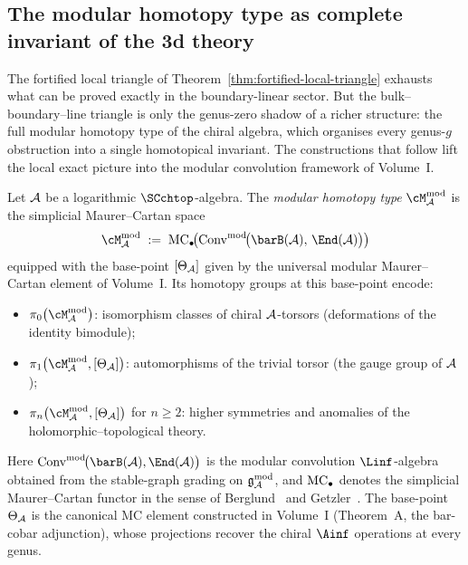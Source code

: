 \subsection{The modular homotopy type as complete invariant of the 3d theory}
\label{subsec:modular-homotopy-type}

The fortified local triangle of
Theorem~\ref{thm:fortified-local-triangle} exhausts what can be
proved exactly in the boundary-linear sector. But the bulk--boundary--line
triangle is only the genus-zero shadow of a richer structure: the
full modular homotopy type of the chiral algebra, which organises
every genus-$g$ obstruction into a single homotopical invariant.
The constructions that follow lift the local exact picture into
the modular convolution framework of Volume~I.

\begin{definition}
\label{def:modular-homotopy-type}
Let $\mathcal{A}$ be a logarithmic $\SCchtop$-algebra.
The \emph{modular homotopy type} $\cM^{\mathrm{mod}}_\cA$ is the
simplicial Maurer--Cartan space
\begin{equation}\label{eq:modular-homotopy-type}
\cM^{\mathrm{mod}}_\cA
\;:=\;
\MC_\bullet\!\bigl(
 \Conv^{\mathrm{mod}}\!\bigl(\barB(\cA),\, \End(\cA)\bigr)
\bigr)
\end{equation}
equipped with the base-point $[\Theta_{\mathcal{A}}]$ given by the
universal modular Maurer--Cartan element of Volume~I. Its
homotopy groups at this base-point encode:
\begin{itemize}[leftmargin=1.8em]
\item $\pi_0\bigl(\cM^{\mathrm{mod}}_\cA\bigr)$: isomorphism
 classes of chiral $\mathcal{A}$-torsors (deformations of the identity
 bimodule);
\item $\pi_1\bigl(\cM^{\mathrm{mod}}_\cA, [\Theta_\cA]\bigr)$:
 automorphisms of the trivial torsor (the gauge group of $\mathcal{A}$);
\item $\pi_n\bigl(\cM^{\mathrm{mod}}_\cA, [\Theta_\cA]\bigr)$
 for $n\ge 2$: higher symmetries and anomalies of the
 holomorphic--topological theory.
\end{itemize}
\end{definition}

\noindent
Here $\Conv^{\mathrm{mod}}\!\bigl(\barB(\cA),\End(\cA)\bigr)$
is the modular convolution $\Linf$-algebra obtained from the
stable-graph grading on $\mathfrak{g}^{\mathrm{mod}}_{\mathcal{A}}$, and $\operatorname{MC}_\bullet$ denotes the
simplicial Maurer--Cartan functor in the sense of
Berglund~\cite{Berglund15} and Getzler~\cite{Getzler09}. The
base-point $\Theta_{\mathcal{A}}$ is the canonical MC element constructed in
Volume~I (Theorem~A, the bar-cobar adjunction), whose projections recover
the chiral $\Ainf$ operations at every genus.

